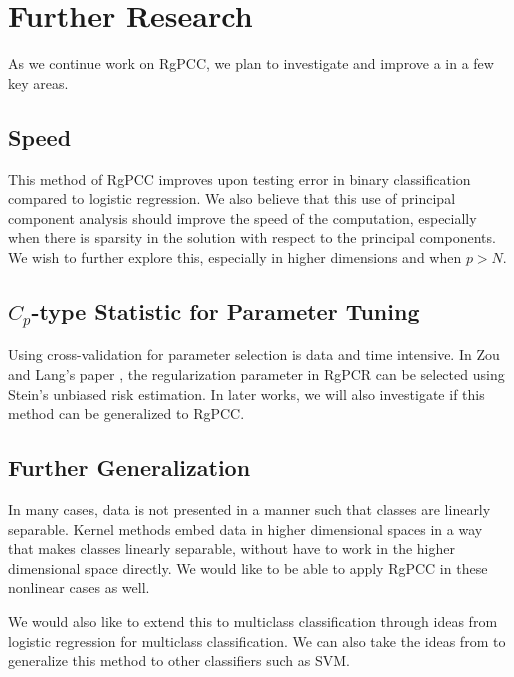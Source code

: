 \documentclass[main.tex]{subfiles}
\begin{document}
\section{Further Research}
As we continue work on RgPCC, we plan to investigate and improve a in a few key areas.

\subsection{Speed}
This method of RgPCC improves upon testing error in binary classification compared to logistic regression. We also believe that this use of principal component analysis should improve the speed of the computation, especially when there is sparsity in the solution with respect to the principal components. We wish to further explore this, especially in higher dimensions and when $p > N$.

\subsection{$C_p$-type Statistic for Parameter Tuning}
Using cross-validation for parameter selection is data and time intensive. In Zou and Lang's paper \cite{langzou}, the regularization parameter in RgPCR can be selected using Stein's unbiased risk estimation. In later works, we will also investigate if this method can be generalized to RgPCC.

\subsection{Further Generalization}
In many cases, data is not presented in a manner such that classes are linearly separable. Kernel methods embed data in higher dimensional spaces in a way that makes classes linearly separable, without have to work in the higher dimensional space directly. We would like to be able to apply RgPCC in these nonlinear cases as well.

We would also like to extend this to multiclass classification through ideas from logistic regression for multiclass classification. We can also take the ideas from \cite{wangleng} to generalize this method to other classifiers such as SVM.
\end{document}
